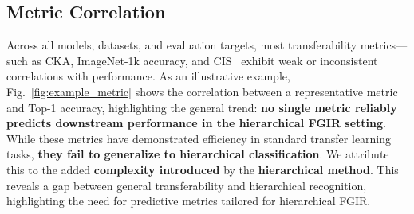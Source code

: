 \documentclass[10pt,twocolumn]{article}
\begin{document}
\subsection{Metric Correlation}
Across all models, datasets, and evaluation targets, most transferability metrics—such as CKA, ImageNet-1k accuracy, and CIS~\cite{kornblith_better_2019, nayman_diverse_2022} exhibit weak or inconsistent correlations with performance. As an illustrative example, Fig.~\ref{fig:example_metric} shows the correlation between a representative metric and Top-1 accuracy, highlighting the general trend: \textbf{no single metric reliably predicts downstream performance in the hierarchical FGIR setting}. While these metrics have demonstrated efficiency in standard transfer learning tasks, \textbf{they fail to generalize to hierarchical classification}. We attribute this to the added \textbf{complexity introduced} by the \textbf{hierarchical method}. This reveals a gap between general transferability and hierarchical recognition, highlighting the need for predictive metrics tailored for hierarchical FGIR.


\end{document}
